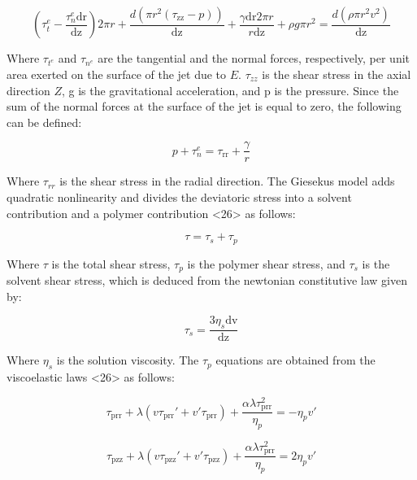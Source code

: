\begin{equation}
\left(\tau _t^e-\frac{\tau _n^e \text{dr}}{\text{dz}}\right) 2 \pi  r+\frac{d \left(\pi  r^2
   \left(\tau _{\text{zz}}-p\right)\right)}{\text{dz}}+\frac{\gamma  \text{dr} 2 \pi  r}{r
   \text{dz}}+\rho  g \pi  r^2=\frac{d \left(\rho  \pi  r^2 v^2\right)}{\text{dz}}
\label{eq:linearMomentum}
\end{equation}

Where $\tau_{t^e}$ and $\tau_{n^e}$ are the tangential and the normal forces, respectively, per unit area exerted on the surface of the jet due to $E$. $\tau_{zz}$ is the shear stress in the axial direction $Z$, g is the gravitational acceleration, and p is the pressure. Since the sum of the normal forces at the surface of the jet is equal to zero, the following can be defined:

\begin{equation}
p+\tau _n^e=\tau _{\text{rr}}+\frac{\gamma }{r}
\label{eq:sumNormalForces}
\end{equation}

Where $\tau_{rr}$ is the shear stress in the radial direction. The Giesekus model adds quadratic nonlinearity and divides the deviatoric stress into a solvent contribution and a polymer contribution <26> as follows:

\begin{equation}
\tau =\tau _s+\tau _p
\label{eq:shearStress}
\end{equation}

Where $\tau$ is the total shear stress, $\tau_{p}$ is the polymer shear stress, and $\tau_{s}$ is the solvent shear stress, which is deduced from the newtonian constitutive law given by:

\begin{equation}
\tau _s=\frac{3 \eta _s \text{dv}}{\text{dz}}
\label{eq:solventShearStress}
\end{equation}

Where $\eta_{s}$ is the solution viscosity. The $\tau_{p}$ equations are obtained from the viscoelastic laws <26> as follows:

\begin{equation}
\tau _{\text{prr}}+\lambda  \left(v \tau _{\text{prr}}'+v' \tau
   _{\text{prr}}\right)+\frac{\alpha  \lambda  \tau _{\text{prr}}^2}{\eta _p}=-\eta _p v'
\label{eq:polymer1ShearStress}
\end{equation}

\begin{equation}
\tau _{\text{pzz}}+\lambda  \left(v \tau _{\text{pzz}}'+v' \tau
   _{\text{pzz}}\right)+\frac{\alpha  \lambda  \tau _{\text{prr}}^2}{\eta _p}=2 \eta _p v'
\label{eq:polymer2ShearStress}
\end{equation}


